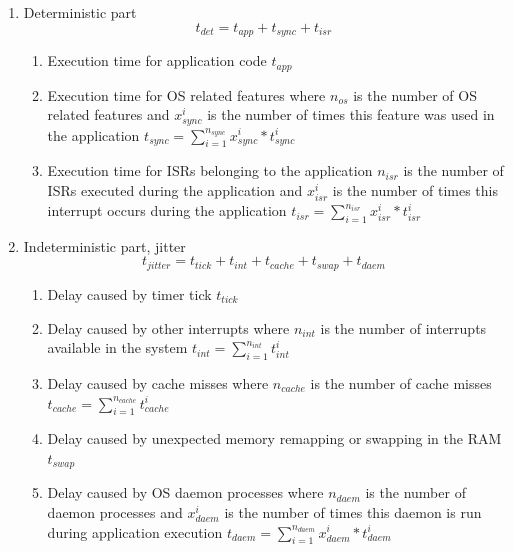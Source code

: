 \begin{enumerate}
	\item Deterministic part 
	\begin{equation}
			t_{det} = t_{app} + t_{sync} + t_{isr}
		\label{eq_det_app}
	\end{equation}  		
		\begin{enumerate}
			\item Execution time for application code $ t_{app} $ 
			\item Execution time for \ac{OS} related features where $ n_{os} $ is the number of \ac{OS} 
						related features and $ x_{sync}^{i} $ is the number of times this feature was used in the application 
						$ t_{sync} = \sum\limits_{i=1}^{n_{sync}} {x_{sync}^{i} * t_{sync}^{i}} $
			\item Execution time for \acp{ISR} belonging to the application $ n_{isr} $ is the number of 
						\acp{ISR} executed during the application and $ x_{isr}^{i} $ is the number of times this interrupt
						occurs during the application
						$ t_{isr} = \sum\limits_{i=1}^{n_{isr}} {x_{isr}^{i} * t_{isr}^{i}} $						
		\end{enumerate}	
  \item Indeterministic part, jitter 
  \begin{equation}
   t_{jitter} = t_{tick} + t_{int} + t_{cache} + t_{swap} + t_{daem} 		
   \label{eq_indet_app}
	\end{equation}
		\begin{enumerate}
			\item Delay caused by timer tick $ t_{tick} $
			\item Delay caused by other interrupts where $ n_{int} $ is the number of interrupts available in the system 
						$ t_{int} = \sum\limits_{i=1}^{n_{int}} {t_{int}^{i}} $
			\item Delay caused by cache misses where $ n_{cache} $ is the number of cache misses 
						$ t_{cache} =  \sum\limits_{i=1}^{n_{cache}} {t_{cache}^{i}}$
			\item Delay caused by unexpected memory remapping or swapping in the \ac{RAM} $ t_{swap} $  
			\item Delay caused by \ac{OS} daemon processes where $ n_{daem} $ is the number of daemon processes and
						$ x_{daem}^{i} $ is the number of times this daemon is run during application execution
						$ t_{daem} = \sum\limits_{i=1}^{n_{daem}} {x_{daem}^{i} * t_{daem}^{i}} $
		\end{enumerate}	
\end{enumerate}
 
